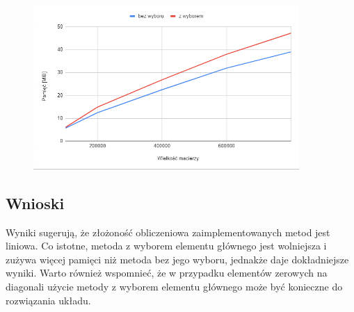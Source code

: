 \documentclass[12pt]{article}
\begin{document}
\begin{figure}[!htbp]
	\centering
	{\includegraphics[width=0.9\textwidth]{memory.png}}
\end{figure}	

\subsection{Wnioski}
Wyniki sugerują, że złożoność obliczeniowa zaimplementowanych metod jest liniowa. Co istotne, metoda z wyborem elementu głównego jest wolniejsza i zużywa więcej pamięci niż metoda bez jego wyboru, jednakże daje dokładniejsze wyniki. Warto również wspomnieć, że w przypadku elementów zerowych na diagonali użycie metody z wyborem elementu głównego może być konieczne do rozwiązania układu.
\end{document}
